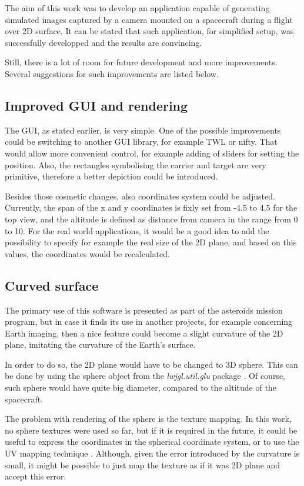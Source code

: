 \documentclass[english,12pt,a4paper,pdftex,elec,utf8]{aaltothesis}
\begin{document}
The aim of this work was to develop an application capable of generating simulated images captured by a camera mounted on a spacecraft during a flight over 2D surface. It can be stated that such application, for simplified setup, was successfully developped and the results are convincing.

Still, there is a lot of room for future development and more improvements. Several suggestions for such improvements are listed below.


\subsection*{Improved GUI and rendering}

The GUI, as stated earlier, is very simple. One of the possible improvements could be switching to another GUI library, for example TWL\cite{TWL} or nifty\cite{Nifty}. That would allow more convenient control, for example adding of sliders for setting the position. Also, the rectangles symbolising the carrier and target are very primitive, therefore a better depiction could be introduced.

Besides those cosmetic changes, also coordinates system could be adjusted. Currently, the span of the x and y coordinates is fixly set from -4.5 to 4.5 for the top view, and the altitude is defined as distance from camera in the range from 0 to 10. For the real world applications, it would be a good idea to add the possibility to specify for example the real size of the 2D plane, and based on this values, the coordinates would be recalculated.

\subsection*{Curved surface}

The primary use of this software is presented as part of the asteroids mission program, but in case it finds its use in another projects, for example concerning Earth imaging, then a nice feature could become a slight curvature of the 2D plane, imitating the curvature of the Earth's surface. 

In order to do so, the 2D plane would have to be changed to 3D sphere. This can be done by using the sphere object from the \textit{lwjgl.util.glu} package \cite{lwjglSphere}. Of course, such sphere would have quite big diameter, compared to the altitude of the spacecraft. 

The problem with rendering of the sphere is the texture mapping. In this work, no sphere textures were used so far, but if it is required in the future, it could be useful to express the coordinates in the spherical coordinate system, or to use the UV mapping technique \cite{UVmappingWiki}. Although, given the error introduced by the curvature is small, it might be possible to just map the texture as if it was 2D plane and accept this error.
\end{document}
